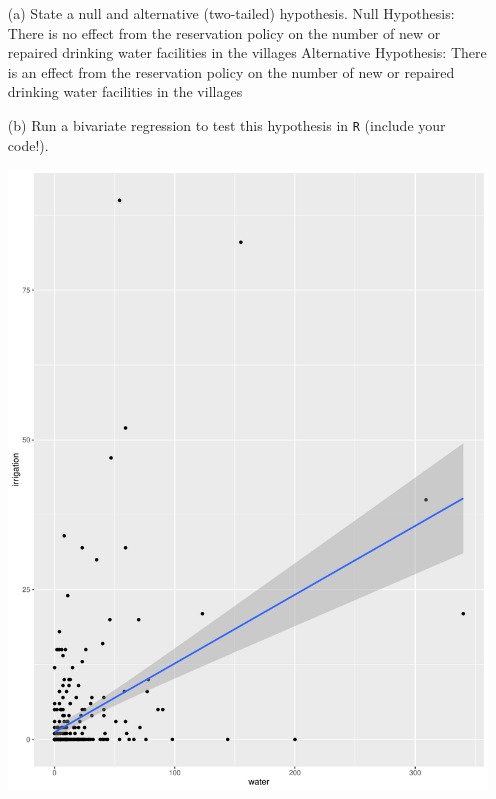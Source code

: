 \documentclass[12pt,letterpaper]{article}
\begin{document}
\newpage
\begin{enumerate}
	\item [(a)] State a null and alternative (two-tailed) hypothesis. 
Null Hypothesis: There is no effect from the reservation policy on the number of new or repaired drinking water facilities in the villages
Alternative Hypothesis: There is an effect from the reservation policy on the number of new or repaired drinking water facilities in the villages
	\vspace{6cm}
	\item [(b)] Run a bivariate regression to test this hypothesis in \texttt{R} (include your code!).
	 
	\includegraphics{plot2-B-first}

\end{enumerate}
\end{document}
